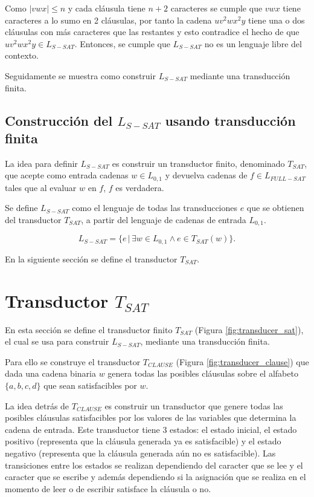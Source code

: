 Como $|vwx|\leq n$ y cada cláusula tiene $n+2$ caracteres se cumple que $vwx$ tiene caracteres a lo sumo en 2 cláusulas,
por tanto la cadena $uv^2wx^2y$ tiene una o dos cláusulas con más caracteres que las restantes y esto contradice el hecho
de que $uv^2wx^2y\in L_{S-SAT}$. Entonces, se cumple que $L_{S-SAT}$ no es un lenguaje libre del contexto.

Seguidamente se muestra como construir $L_{S-SAT}$ mediante una transducción finita.

\subsection{Construcción del $L_{S-SAT}$ usando transducción finita}

La idea para definir $L_{S-SAT}$ es construir un transductor finito, denominado $T_{SAT}$, que acepte como
entrada cadenas $w\in L_{0,1}$ y devuelva cadenas de $f\in L_{FULL-SAT}$ tales que al evaluar $w$ en $f$, $f$
es verdadera.

Se define $L_{S-SAT}$ como el lenguaje de todas las transducciones $e$ que se obtienen del transductor
$T_{SAT}$, a partir del lenguaje de cadenas de entrada $L_{0,1}$.

$$L_{S-SAT} = \{e\,|\,\exists w \in L_{0,1} \wedge e \in T_{SAT}(w) \}.$$

En la siguiente sección se define el transductor $T_{SAT}$.

\section{Transductor $T_{SAT}$}
\label{sec:tsat}

En esta sección se define el transductor finito $T_{SAT}$ (Figura \ref{fig:transducer_sat}), el cual se usa para construir $L_{S-SAT}$, mediante
una transducción finita.

Para ello se construye el transductor $T_{CLAUSE}$ (Figura \ref{fig:transducer_clause}) que dada una cadena binaria $w$
genera todas las posibles cláusulas sobre el alfabeto $\{a,b,c,d\}$ que sean satisfacibles por $w$.

La idea detrás de $T_{CLAUSE}$ es construir un transductor que genere todas las posibles cláusulas satisfacibles
por los valores de las variables que determina la cadena de entrada. Este transductor tiene 3 estados: el
estado inicial, el estado positivo (representa que la cláusula generada ya es satisfacible) y el estado
negativo (representa que la cláusula generada aún no es satisfacible). Las transiciones entre los estados
se realizan dependiendo del caracter que se lee y el caracter que se escribe y además dependiendo si la asignación
que se realiza en el momento de leer o de escribir satisface la cláusula o no.

